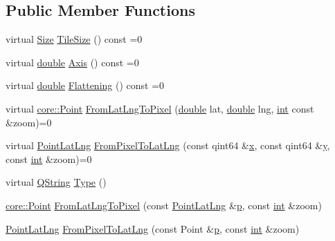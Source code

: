 \subsection*{Public Member Functions}
\begin{DoxyCompactItemize}
\item 
virtual \hyperlink{structcore_1_1_size}{Size} \hyperlink{group___o_p_map_widget_ga745313ff69d0f869f456ccbc312cc2bf}{Tile\-Size} () const =0
\item 
virtual \hyperlink{_super_l_u_support_8h_a8956b2b9f49bf918deed98379d159ca7}{double} \hyperlink{group___o_p_map_widget_ga72d36ba021583a6dec5f549c6137494a}{Axis} () const =0
\item 
virtual \hyperlink{_super_l_u_support_8h_a8956b2b9f49bf918deed98379d159ca7}{double} \hyperlink{group___o_p_map_widget_ga253e85d9958729b994bf7b9e075297de}{Flattening} () const =0
\item 
virtual \hyperlink{structcore_1_1_point}{core\-::\-Point} \hyperlink{group___o_p_map_widget_gacadfc01954e3e37c801106981b297b45}{From\-Lat\-Lng\-To\-Pixel} (\hyperlink{_super_l_u_support_8h_a8956b2b9f49bf918deed98379d159ca7}{double} lat, \hyperlink{_super_l_u_support_8h_a8956b2b9f49bf918deed98379d159ca7}{double} lng, \hyperlink{ioapi_8h_a787fa3cf048117ba7123753c1e74fcd6}{int} const \&zoom)=0
\item 
virtual \hyperlink{structinternals_1_1_point_lat_lng}{Point\-Lat\-Lng} \hyperlink{group___o_p_map_widget_ga235a8ad2ed5da22f78e0c5d447f8d34c}{From\-Pixel\-To\-Lat\-Lng} (const qint64 \&\hyperlink{glext_8h_a1db9d104e3c2128177f26aff7b46982f}{x}, const qint64 \&\hyperlink{glext_8h_a42315f3ed8fff752bb47fd782309fcfc}{y}, const \hyperlink{ioapi_8h_a787fa3cf048117ba7123753c1e74fcd6}{int} \&zoom)=0
\item 
virtual \hyperlink{group___u_a_v_objects_plugin_gab9d252f49c333c94a72f97ce3105a32d}{Q\-String} \hyperlink{group___o_p_map_widget_gae371ba9189e5318e016af0df9cf0123f}{Type} ()
\item 
\hyperlink{structcore_1_1_point}{core\-::\-Point} \hyperlink{group___o_p_map_widget_ga18aa4617ab63019451badac8567c85d8}{From\-Lat\-Lng\-To\-Pixel} (const \hyperlink{structinternals_1_1_point_lat_lng}{Point\-Lat\-Lng} \&\hyperlink{glext_8h_aa5367c14d90f462230c2611b81b41d23}{p}, const \hyperlink{ioapi_8h_a787fa3cf048117ba7123753c1e74fcd6}{int} \&zoom)
\item 
\hyperlink{structinternals_1_1_point_lat_lng}{Point\-Lat\-Lng} \hyperlink{group___o_p_map_widget_ga44df6b58603a8cdba19f7bf899cc57bc}{From\-Pixel\-To\-Lat\-Lng} (const Point \&\hyperlink{glext_8h_aa5367c14d90f462230c2611b81b41d23}{p}, const \hyperlink{ioapi_8h_a787fa3cf048117ba7123753c1e74fcd6}{int} \&zoom)

\end{DoxyCompactItemize}

